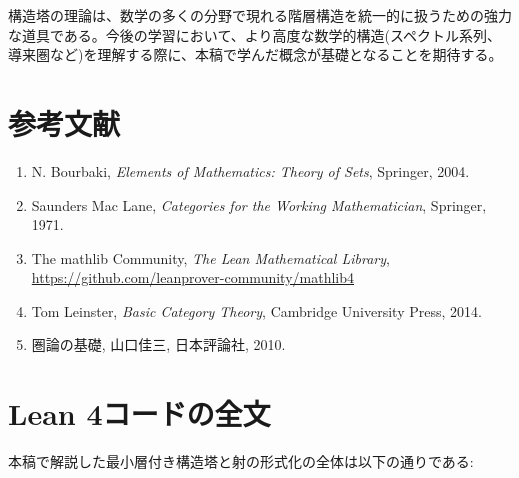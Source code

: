 \documentclass[a4paper,12pt]{article}
\theoremstyle{definition}
\begin{document}
構造塔の理論は、数学の多くの分野で現れる階層構造を統一的に扱うための強力な道具である。今後の学習において、より高度な数学的構造(スペクトル系列、導来圏など)を理解する際に、本稿で学んだ概念が基礎となることを期待する。

\section*{参考文献}

\begin{enumerate}
\item N. Bourbaki, \textit{Elements of Mathematics: Theory of Sets}, Springer, 2004.
\item Saunders Mac Lane, \textit{Categories for the Working Mathematician}, Springer, 1971.
\item The mathlib Community, \textit{The Lean Mathematical Library}, \url{https://github.com/leanprover-community/mathlib4}
\item Tom Leinster, \textit{Basic Category Theory}, Cambridge University Press, 2014.
\item 圏論の基礎, 山口佳三, 日本評論社, 2010.
\end{enumerate}

\appendix

\section{Lean 4コードの全文}

本稿で解説した最小層付き構造塔と射の形式化の全体は以下の通りである:
\end{document}
